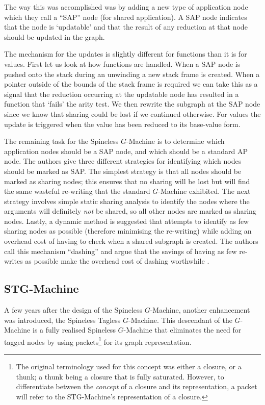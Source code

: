     The way this was accomplished was by adding a new type of application node
which they call a ``SAP'' node (for shared application). A SAP node indicates
that the node is `updatable' and that the result of any reduction at that node
should be updated in the graph. 

    The mechanism for the updates is slightly different for functions than it is
for values. First let us look at how functions are handled. When a SAP node is 
pushed onto the stack during an unwinding a new stack frame is created. When a
pointer outside of the bounds of the stack frame is required we can take this as
a signal that the reduction occurring at the updatable node has resulted in a
function that `fails' the arity test. We then rewrite the subgraph at the SAP
node since we know that sharing could be lost if we continued otherwise.
For values the update is triggered when the value has been reduced to its
base-value form.

    The remaining task for the Spineless $G$-Machine is to determine which
application nodes should be a SAP node, and which should be a standard AP node. 
The authors give three different strategies for identifying which nodes should
be marked as SAP. The simplest strategy is that all nodes should be marked as
sharing nodes; this ensures that no sharing will be lost but will find the same
wasteful re-writing that the standard $G$-Machine exhibited. The next strategy
involves simple static sharing analysis to identify the nodes where the
arguments will definitely \emph{not} be shared, so all other nodes are marked as
sharing nodes. Lastly, a dynamic method is suggested that attempts to identify
as few sharing nodes as possible (therefore minimising the re-writing) while
adding an overhead cost of having to check when a shared subgraph is created.
The authors call this mechanism ``dashing'' and argue that the savings of having
as few re-writes as possible make the overhead cost of dashing worthwhile
\cite{burn1988spineless}.


 \subsection{STG-Machine}
    A few years after the design of the Spineless $G$-Machine, another
enhancement was introduced, the Spineless Tagless $G$-Machine. This descendant of
the $G$-Machine is a fully realised Spineless $G$-Machine that eliminates the
need for tagged nodes by using packets\footnote{The original terminology used
for this concept was either a closure, or a thunk; a thunk being a closure that
is fully saturated. However, to differentiate between the \emph{concept} of a
closure and its representation, a packet will refer to the STG-Machine's 
representation of a closure.} for its graph representation. 

